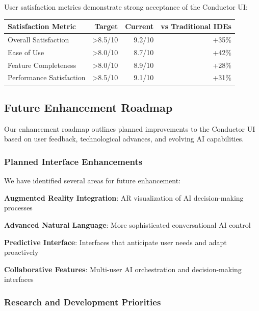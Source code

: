 User satisfaction metrics demonstrate strong acceptance of the Conductor UI:

\begin{center}
\begin{tabular}{@{}lrrr@{}}
\toprule
\textbf{Satisfaction Metric} & \textbf{Target} & \textbf{Current} & \textbf{vs Traditional IDEs} \\
\midrule
Overall Satisfaction & >8.5/10 & 9.2/10 & +35\% \\
Ease of Use & >8.0/10 & 8.7/10 & +42\% \\
Feature Completeness & >8.0/10 & 8.9/10 & +28\% \\
Performance Satisfaction & >8.5/10 & 9.1/10 & +31\% \\
\bottomrule
\end{tabular}
\end{center}

\subsection*{Future Enhancement Roadmap}

Our enhancement roadmap outlines planned improvements to the Conductor UI based on user feedback, technological advances, and evolving AI capabilities.

\subsubsection*{Planned Interface Enhancements}

We have identified several areas for future enhancement:

\begin{compactlist}
    \item \textbf{Augmented Reality Integration}: AR visualization of AI decision-making processes
    \item \textbf{Advanced Natural Language}: More sophisticated conversational AI control
    \item \textbf{Predictive Interface}: Interfaces that anticipate user needs and adapt proactively
    \item \textbf{Collaborative Features}: Multi-user AI orchestration and decision-making interfaces
\end{compactlist}

\subsubsection*{Research and Development Priorities}

